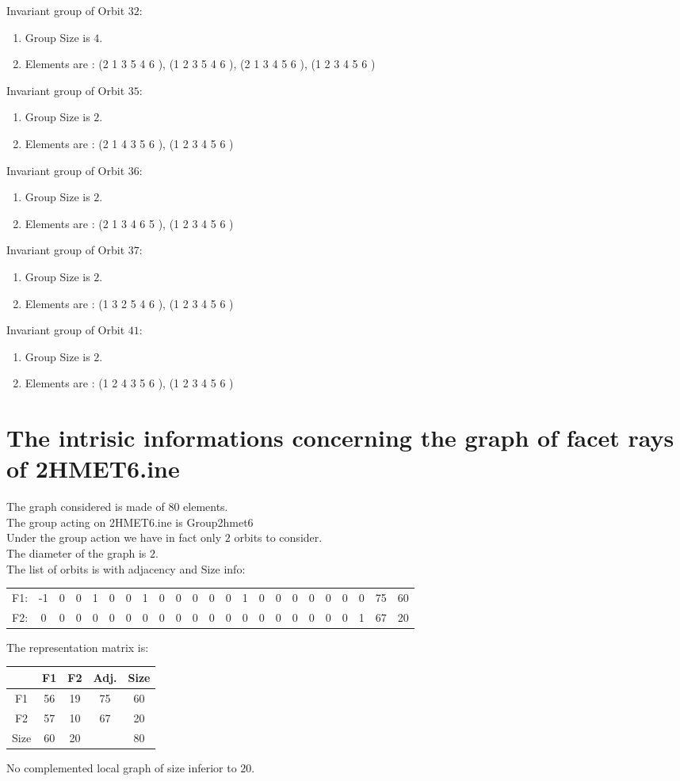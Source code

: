 \documentclass[12pt]{article}
\begin{document}
Invariant group of Orbit $32$:
\begin{enumerate}
\item Group Size is $4$.
\item Elements are : (2 1 3 5 4 6  ), (1 2 3 5 4 6  ), (2 1 3 4 5 6  ), (1 2 3 4 5 6  )
\end{enumerate}
Invariant group of Orbit $35$:
\begin{enumerate}
\item Group Size is $2$.
\item Elements are : (2 1 4 3 5 6  ), (1 2 3 4 5 6  )
\end{enumerate}
Invariant group of Orbit $36$:
\begin{enumerate}
\item Group Size is $2$.
\item Elements are : (2 1 3 4 6 5  ), (1 2 3 4 5 6  )
\end{enumerate}
Invariant group of Orbit $37$:
\begin{enumerate}
\item Group Size is $2$.
\item Elements are : (1 3 2 5 4 6  ), (1 2 3 4 5 6  )
\end{enumerate}
Invariant group of Orbit $41$:
\begin{enumerate}
\item Group Size is $2$.
\item Elements are : (1 2 4 3 5 6  ), (1 2 3 4 5 6  )
\end{enumerate}
\section{The intrisic informations concerning the graph of facet rays of 2HMET6.ine}
The graph considered is made of $80$ elements.\\
The group acting on 2HMET6.ine is Group2hmet6\\
Under the group action we have in fact only $2$ orbits to consider.\\
The diameter of the graph is $2$.\\
The list of orbits is with adjacency and Size info:
\begin{center}
\scriptsize
\begin{tabular}{ccccccccccccccccccccc|c|c}
F1:&-1&0&0&1&0&0&1&0&0&0&0&0&1&0&0&0&0&0&0&0&75&60\\
F2:&0&0&0&0&0&0&0&0&0&0&0&0&0&0&0&0&0&0&0&1&67&20\\
\end{tabular}
\end{center}
The representation matrix is:
\begin{center}
\scriptsize
\begin{tabular}{|c|cc|c|c|}
\hline
&F1&F2&Adj.&Size\\
\hline
F1& 56& 19&75&60\\
F2& 57& 10&67&20\\
\hline
Size&60&20&&80\\
\hline
\end{tabular}
\end{center}
No complemented local graph of size inferior to $20$.
\end{document}
